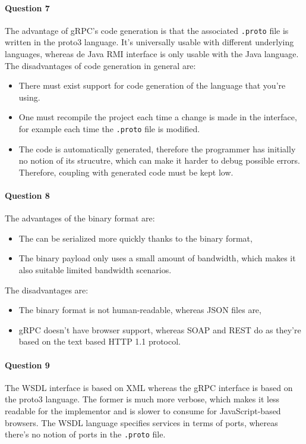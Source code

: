 \documentclass{ds-report}
\begin{document}
	\paragraph{Question 7}
	The advantage of gRPC's code generation is that the associated \texttt{.proto} file is written in the proto3 language. It's universally usable with different underlying languages, whereas de Java RMI interface is only usable with the Java language.
	The disadvantages of code generation in general are:
	\begin{itemize}
		\item There must exist support for code generation of the language that you're using.
		\item One must recompile the project each time a change is made in the interface, for example each time the \texttt{.proto} file is modified.
		\item The code is automatically generated, therefore the programmer has initially no notion of its strucutre, which can make it harder to debug possible errors. Therefore, coupling with generated code must be kept low.
	\end{itemize}

	\paragraph{Question 8}
	The advantages of the binary format are:
	\begin{itemize}
		\item The can be serialized more quickly thanks to the binary format,
		\item The binary payload only uses a small amount of bandwidth, which makes it also suitable limited bandwidth scenarios.
	\end{itemize}
	The disadvantages are:
	\begin{itemize}
		\item The binary format is not human-readable, whereas JSON files are,
		\item gRPC doesn't have browser support, whereas SOAP and REST do as they're based on the text based HTTP 1.1 protocol.
	\end{itemize}
	
	\paragraph{Question 9}
	The WSDL interface is based on XML whereas the gRPC interface is based on the proto3 language. The former is much more verbose, which makes it less readable for the implementor and is slower to consume for JavaScript-based browsers. The WSDL language specifies services in terms of ports, whereas there's no notion of ports in the \texttt{.proto} file. 
	
\end{document}
